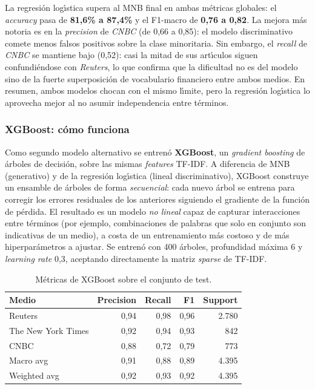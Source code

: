 \documentclass[11pt,a4paper]{article}
\begin{document}
La regresi\'{o}n log\'{\i}stica supera al MNB final en ambas m\'{e}tricas globales: el \textit{accuracy} pasa de \textbf{81,6\% a 87,4\%} y el F1-macro de \textbf{0,76 a 0,82}. La mejora m\'{a}s notoria es en la \textit{precision} de \textit{CNBC} (de 0,66 a 0,85): el modelo discriminativo comete menos falsos positivos sobre la clase minoritaria. Sin embargo, el \textit{recall} de \textit{CNBC} se mantiene bajo (0,52): casi la mitad de sus art\'{\i}culos siguen confundi\'{e}ndose con \textit{Reuters}, lo que confirma que la dificultad no es del modelo sino de la fuerte superposici\'{o}n de vocabulario financiero entre ambos medios. En resumen, ambos modelos chocan con el mismo l\'{\i}mite, pero la regresi\'{o}n log\'{\i}stica lo aprovecha mejor al no asumir independencia entre t\'{e}rminos.

\subsubsection*{XGBoost: c\'{o}mo funciona}

Como segundo modelo alternativo se entren\'{o} \textbf{XGBoost}, un \textit{gradient boosting} de \'{a}rboles de decisi\'{o}n, sobre las mismas \textit{features} TF-IDF. A diferencia de MNB (generativo) y de la regresi\'{o}n log\'{\i}stica (lineal discriminativo), XGBoost construye un ensamble de \'{a}rboles de forma \textit{secuencial}: cada nuevo \'{a}rbol se entrena para corregir los errores residuales de los anteriores siguiendo el gradiente de la funci\'{o}n de p\'{e}rdida. El resultado es un modelo \textit{no lineal} capaz de capturar interacciones entre t\'{e}rminos (por ejemplo, combinaciones de palabras que solo en conjunto son indicativas de un medio), a costa de un entrenamiento m\'{a}s costoso y de m\'{a}s hiperpar\'{a}metros a ajustar. Se entren\'{o} con 400 \'{a}rboles, profundidad m\'{a}xima 6 y \textit{learning rate} 0,3, aceptando directamente la matriz \textit{sparse} de TF-IDF.

\begin{table}[H]
\centering
\caption{M\'{e}tricas de XGBoost sobre el conjunto de test.}
\label{tab:metrics_xgb}
\begin{tabular}{l r r r r}
\toprule
\textbf{Medio} & \textbf{Precision} & \textbf{Recall} & \textbf{F1} & \textbf{Support} \\
\midrule
Reuters            & 0,94 & 0,98 & 0,96 & 2.780 \\
The New York Times & 0,92 & 0,94 & 0,93 &   842 \\
CNBC               & 0,88 & 0,72 & 0,79 &   773 \\
\midrule
Macro avg          & 0,91 & 0,88 & 0,89 & 4.395 \\
Weighted avg       & 0,92 & 0,93 & 0,92 & 4.395 \\
\bottomrule
\end{tabular}
\end{table}
\end{document}
